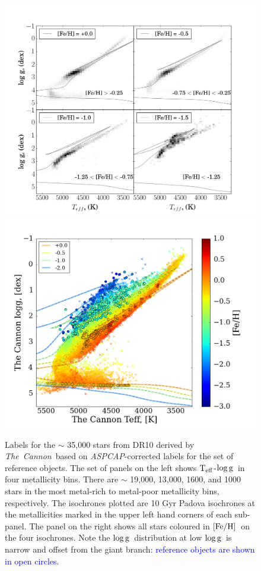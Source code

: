 \documentclass[12pt, preprint]{aastex}
\newcommand{\tc}{\textsl{The~Cannon}}
\newcommand{\aspcap}{\textsl{ASPCAP}}
\newcommand{\teff}{\mbox{$\rm T_{eff}$}}
\newcommand{\feh}{\mbox{$\rm [Fe/H]$}}
\newcommand{\logg}{\mbox{$\rm \log g$}}
\begin{document}
\begin{figure}[!h]
\centering
  \includegraphics[scale=0.26]{./plots/aftersubmit/fig8a.png}
  \hspace{-20pt}
    \includegraphics[scale=0.26]{./plots/aftersubmit/fig8b2.png}
\caption{Labels for the $\sim$ 35,000 stars from DR10 derived by \tc\ based on \aspcap-corrected labels for the set of reference objects. The set of panels on the left shows \teff-\logg\ in four metallicity bins. There are $\sim$ 19,000, 13,000, 1600, and 1000 stars in the most metal-rich to metal-poor metallicity bins, respectively. The isochrones plotted are 10 Gyr Padova isochrones at the metallicities marked in the upper left hand corners of each sub-panel.  The panel on the right shows all stars coloured in \feh\ on the four isochrones. Note the \logg\ distribution at low \logg\ is narrow and offset from the giant branch:  \textcolor{blue}{ reference objects are shown in open circles.} }
\label{fig:iso}
\end{figure}
\end{document}
